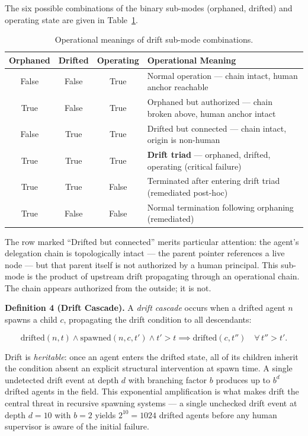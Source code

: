 The six possible combinations of the binary sub-modes (orphaned, drifted) and operating state are given in Table~\ref{tab:rs-drift-submodes}.

\begin{table}[h]
\centering
\begin{tabular}{c|c|c|p{4.8cm}}
\textbf{Orphaned} & \textbf{Drifted} & \textbf{Operating} & \textbf{Operational Meaning} \\ \hline
False & False & True  & Normal operation — chain intact, human anchor reachable \\
True  & False & True  & Orphaned but authorized — chain broken above, human anchor intact \\
False & True  & True  & Drifted but connected — chain intact, origin is non-human \\
True  & True  & True  & \textbf{Drift triad} — orphaned, drifted, operating (critical failure) \\
True  & True  & False & Terminated after entering drift triad (remediated post-hoc) \\
True  & False & False & Normal termination following orphaning (remediated)
\end{tabular}
\caption{Operational meanings of drift sub-mode combinations.}
\label{tab:rs-drift-submodes}
\end{table}

The row marked ``Drifted but connected'' merits particular attention: the agent's delegation chain is topologically intact — the parent pointer references a live node — but that parent itself is not authorized by a human principal. This sub-mode is the product of upstream drift propagating through an operational chain. The chain appears authorized from the outside; it is not.

\medskip
\noindent\textbf{Definition 4 (Drift Cascade).}
A \emph{drift cascade} occurs when a drifted agent $n$ spawns a child $c$, propagating the drift condition to all descendants:

\begin{equation}
\mathrm{drifted}(n, t) \land \mathrm{spawned}(n, c, t') \land t' > t \implies \mathrm{drifted}(c, t'')\quad \forall\, t'' > t'.
\label{eq:rs-drift-cascade}
\end{equation}

Drift is \emph{heritable}: once an agent enters the drifted state, all of its children inherit the condition absent an explicit structural intervention at spawn time. A single undetected drift event at depth $d$ with branching factor $b$ produces up to $b^{d}$ drifted agents in the field. This exponential amplification is what makes drift the central threat in recursive spawning systems — a single unchecked drift event at depth $d=10$ with $b=2$ yields $2^{10}=1024$ drifted agents before any human supervisor is aware of the initial failure.

